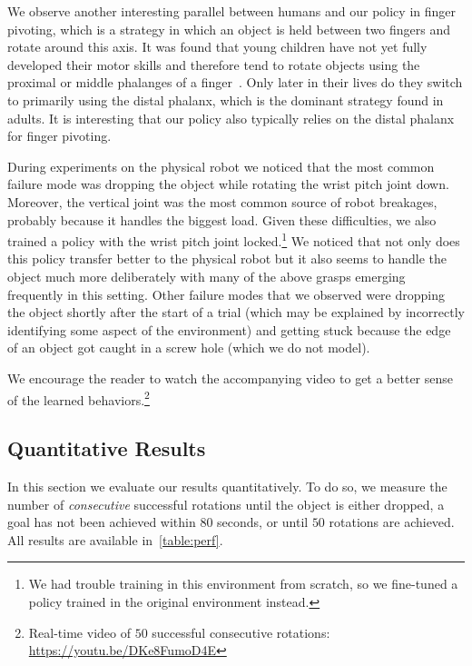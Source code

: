 We observe another interesting parallel between humans and our policy in finger pivoting, which is a strategy in which an object is held between two fingers and rotate around this axis.
It was found that young children have not yet fully developed their motor skills and therefore tend to rotate objects using the proximal or middle phalanges of a finger~\citep{pehoski1997hand}.
Only later in their lives do they switch to primarily using the distal phalanx, which is the dominant strategy found in adults.
It is interesting that our policy also typically relies on the distal phalanx for finger pivoting.

During experiments on the physical robot we noticed that the most common failure mode was dropping the object
while rotating the wrist pitch joint down.
Moreover, the vertical joint was the most common source of robot breakages, probably because
it handles the biggest load.
Given these difficulties,
we also trained a policy with the wrist pitch joint locked.\footnote{We had trouble training
in this environment from scratch, so we fine-tuned
a policy trained in the original environment instead.}
We noticed that not only does this policy transfer better to the physical robot but
it also seems to handle the object much more deliberately with many of the above grasps emerging frequently in this setting.
Other failure modes that we observed were dropping the object shortly after the start of a trial (which may be explained by incorrectly identifying some aspect of the environment) and getting stuck because the edge of an object got caught in a screw hole (which we do not model).



We encourage the reader to watch the accompanying video to get a better sense of the learned behaviors.\footnote{Real-time video of $50$ successful consecutive rotations: \url{https://youtu.be/DKe8FumoD4E}}




\subsection{Quantitative Results}
\label{sec:quant-results}
In this section we evaluate our results quantitatively.
To do so, we measure the number of \emph{consecutive} successful rotations until the object is either dropped, a goal has not been achieved within 80 seconds, or until $50$ rotations are achieved.
All results are available in~\autoref{table:perf}.




